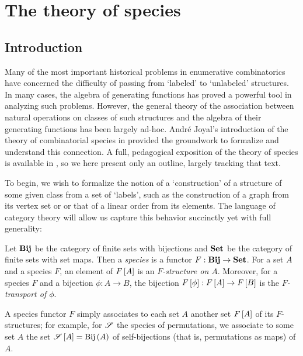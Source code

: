 \documentclass[sectionflow,singlespace,twoside,boldmathhdr,draft]{brandiss} %
\numberwithin{section}{chapter}
\numberwithin{figure}{chapter}
\begin{document}
\listoftables %

\mainmatter

\chapter{The theory of species}\label{c:species}
\section{Introduction}\label{s:introspec}
Many of the most important historical problems in enumerative combinatorics have concerned the difficulty of passing from `labeled' to `unlabeled' structures.
In many cases, the algebra of generating functions has proved a powerful tool in analyzing such problems.
However, the general theory of the association between natural operations on classes of such structures and the algebra of their generating functions has been largely ad-hoc.
Andr\'{e} Joyal's introduction of the theory of combinatorial species in \cite{joy:species} provided the groundwork to formalize and understand this connection.
A full, pedagogical exposition of the theory of species is available in \cite{bll:species}, so we here present only an outline, largely tracking that text.

To begin, we wish to formalize the notion of a `construction' of a structure of some given class from a set of `labels', such as the construction of a graph from its vertex set or or that of a linear order from its elements.
The language of category theory will allow us capture this behavior succinctly yet with full generality:
\begin{definition}\label{def:species}
  Let $\mathbf{Bij}$ be the category of finite sets with bijections and $\mathbf{Set}$ be the category of finite sets with set maps.
  Then a \emph{species} is a functor $F: \mathbf{Bij} \to \mathbf{Set}$.
  For a set $A$ and a species $F$, an element of $F \left[ {A} \right]$ is an \emph{$F$-structure on $A$}.
  Moreover, for a species $F$ and a bijection $\phi: A \to B$, the bijection $F \left[ {\phi} \right]: F \left[ {A} \right] \to F \left[ {B} \right]$ is the \emph{$F$-transport of $\phi$}.
\end{definition}
A species functor $F$ simply associates to each set $A$ another set $F \left[ {A} \right]$ of its $F$-structures; for example, for $\mathscr{S}$ the species of permutations, we associate to some set $A$ the set $\mathscr{S} \left[ {A} \right] = \operatorname{Bij} \left( {A} \right)$ of self-bijections (that is, permutations as maps) of $A$.
\end{document}
